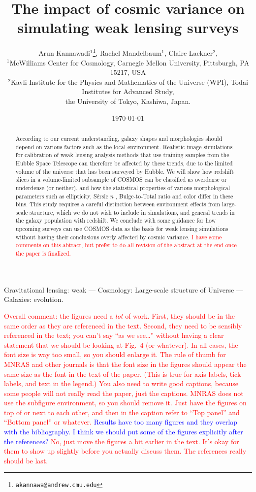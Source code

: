 \documentclass[twocolumn,useAMS,usenatbib]{mn2e}
\title[WL simulation]{The impact of cosmic variance on simulating weak lensing surveys}
\author[Kannawadi et al.]
{Arun Kannawadi$^1$\thanks{\tt akannawa@andrew.cmu.edu}, 
Rachel Mandelbaum$^1$,
Claire Lackner$^2$, 
\\$^1$McWilliams Center for Cosmology, Carnegie Mellon University, Pittsburgh, PA 15217, USA
\\$^2$Kavli Institute for the Physics and Mathematics of the Universe (WPI), Todai Institutes for Advanced Study,\\ the University of Tokyo, Kashiwa, Japan.
}
\date{\today}
\newcommand{\rachel}[1]{{\textcolor{red}{#1}}}
\newcommand{\arun}[1]{{\textcolor{blue}{#1}}}
\newcommand{\sersicn}{S\'{e}rsic $n$ }
\newcommand{\btt}{Bulge-to-Total }
\begin{document}

\maketitle

\begin{abstract}
According to our current understanding, galaxy shapes and morphologies should depend on various factors such as the local environment. Realistic image simulations for calibration of weak lensing analysis methods that use training samples from the Hubble Space Telescope can therefore be affected by these trends, due to the limited volume of the universe that has been surveyed by Hubble. We will show how redshift slices in a volume-limited subsample of COSMOS can be classified as overdense or underdense (or neither), and how the statistical properties of various morphological parameters such as ellipticity, \sersicn, \btt ratio and color differ in these bins. This study requires a careful distinction between environment effects from large-scale structure, which we do not wish to include in simulations, and general trends in the galaxy population with redshift. We conclude with some guidance for how upcoming surveys can use COSMOS data as the basis for weak lensing simulations without having their conclusions overly affected by cosmic variance.  
\rachel{I have some comments on this abtract, but prefer to do all
  revision of the abstract at the end once the paper is finalized.}
\end{abstract}

\begin{keywords}
 Gravitational lensing: weak --- Cosmology: Large-scale structure of Universe --- Galaxies: evolution.
\end{keywords}

\rachel{Overall comment: the figures need a {\em lot} of work.  First,  they should be in the same order as they are referenced in the  text.  Second, they need to be sensibly referenced in the text; you  can't say ``as we see\dots'' without having a clear statement that  we should be looking at Fig.~4 (or whatever).  In all  cases, the font size is way too small, so you should enlarge it.  The rule of thumb for MNRAS and other journals is that the font size  in the figures should appear the same size as the font in the text  of the paper.  (This is true for axis labels, tick labels, and text  in the legend.)  You also need to write good captions, because some  people will not really read the paper, just the captions.  MNRAS
         does not use the subfigure environment, so you should remove it.  Just have the figures on top of or next to each other, and then in  the caption refer to ``Top panel'' and ``Bottom panel'' or whatever.} 
         \arun{Results have too many figures and they overlap with the bibliography. I think we should put some of the figures explicitly after the references?}
 \rachel{No, just move the figures a bit earlier in the text.  It's okay for them to show up slightly before you actually discuss them.  The references really should be last.}
\end{document}
